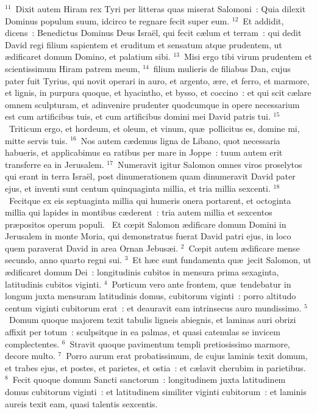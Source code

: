 ${}^{11}$~Dixit autem Hiram rex Tyri per litteras quas miserat Salomoni~: Quia dilexit Dominus populum suum, idcirco te regnare fecit super eum.
${}^{12}$~Et addidit, dicens~: Benedictus Dominus Deus Isra\"el, qui fecit c\ae lum et terram~: qui dedit David regi filium sapientem et eruditum et sensatum atque prudentem, ut \ae dificaret domum Domino, et palatium sibi.
${}^{13}$~Misi ergo tibi virum prudentem et scientissimum Hiram patrem meum,
${}^{14}$~filium mulieris de filiabus Dan, cujus pater fuit Tyrius, qui novit operari in auro, et argento, \ae re, et ferro, et marmore, et lignis, in purpura quoque, et hyacintho, et bysso, et coccino~: et qui scit c\ae lare omnem sculpturam, et adinvenire prudenter quodcumque in opere necessarium est cum artificibus tuis, et cum artificibus domini mei David patris tui.
${}^{15}$~Triticum ergo, et hordeum, et oleum, et vinum, qu\ae\ pollicitus es, domine mi, mitte servis tuis.
${}^{16}$~Nos autem c\ae demus ligna de Libano, quot necessaria habueris, et applicabimus ea ratibus per mare in Joppe~: tuum autem erit transferre ea in Jerusalem.
${}^{17}$~Numeravit igitur Salomon omnes viros proselytos qui erant in terra Isra\"el, post dinumerationem quam dinumeravit David pater ejus, et inventi sunt centum quinquaginta millia, et tria millia sexcenti.
${}^{18}$~Fecitque ex eis septuaginta millia qui humeris onera portarent, et octoginta millia qui lapides in montibus c\ae derent~: tria autem millia et sexcentos pr\ae positos operum populi.
~Et cœpit Salomon \ae dificare domum Domini in Jerusalem in monte Moria, qui demonstratus fuerat David patri ejus, in loco quem paraverat David in area Ornan Jebus\ae i.
${}^{2}$~Cœpit autem \ae dificare mense secundo, anno quarto regni sui.
${}^{3}$~Et h\ae c sunt fundamenta qu\ae\ jecit Salomon, ut \ae dificaret domum Dei~: longitudinis cubitos in mensura prima sexaginta, latitudinis cubitos viginti.
${}^{4}$~Porticum vero ante frontem, qu\ae\ tendebatur in longum juxta mensuram latitudinis domus, cubitorum viginti~: porro altitudo centum viginti cubitorum erat~: et deauravit eam intrinsecus auro mundissimo.
${}^{5}$~Domum quoque majorem texit tabulis ligneis abiegnis, et laminas auri obrizi affixit per totum~: sculpsitque in ea palmas, et quasi catenulas se invicem complectentes.
${}^{6}$~Stravit quoque pavimentum templi pretiosissimo marmore, decore multo.
${}^{7}$~Porro aurum erat probatissimum, de cujus laminis texit domum, et trabes ejus, et postes, et parietes, et ostia~: et c\ae lavit cherubim in parietibus.
${}^{8}$~Fecit quoque domum Sancti sanctorum~: longitudinem juxta latitudinem domus cubitorum viginti~: et latitudinem similiter viginti cubitorum~: et laminis aureis texit eam, quasi talentis sexcentis.
